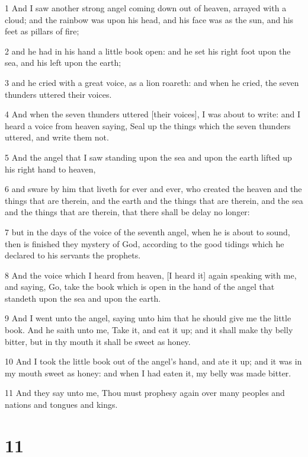 \par 1 And I saw another strong angel coming down out of heaven, arrayed with a cloud; and the rainbow was upon his head, and his face was as the sun, and his feet as pillars of fire;
\par 2 and he had in his hand a little book open: and he set his right foot upon the sea, and his left upon the earth;
\par 3 and he cried with a great voice, as a lion roareth: and when he cried, the seven thunders uttered their voices.
\par 4 And when the seven thunders uttered [their voices], I was about to write: and I heard a voice from heaven saying, Seal up the things which the seven thunders uttered, and write them not.
\par 5 And the angel that I saw standing upon the sea and upon the earth lifted up his right hand to heaven,
\par 6 and sware by him that liveth for ever and ever, who created the heaven and the things that are therein, and the earth and the things that are therein, and the sea and the things that are therein, that there shall be delay no longer:
\par 7 but in the days of the voice of the seventh angel, when he is about to sound, then is finished they mystery of God, according to the good tidings which he declared to his servants the prophets.
\par 8 And the voice which I heard from heaven, [I heard it] again speaking with me, and saying, Go, take the book which is open in the hand of the angel that standeth upon the sea and upon the earth.
\par 9 And I went unto the angel, saying unto him that he should give me the little book. And he saith unto me, Take it, and eat it up; and it shall make thy belly bitter, but in thy mouth it shall be sweet as honey.
\par 10 And I took the little book out of the angel's hand, and ate it up; and it was in my mouth sweet as honey: and when I had eaten it, my belly was made bitter.
\par 11 And they say unto me, Thou must prophesy again over many peoples and nations and tongues and kings.

\chapter{11}

